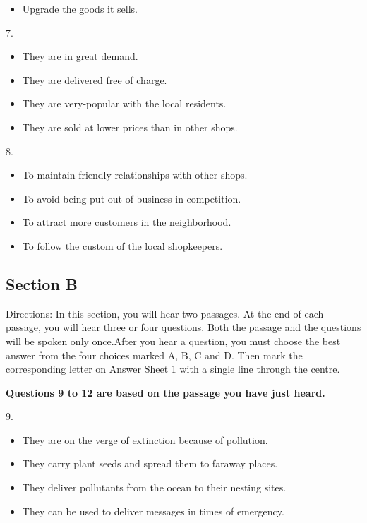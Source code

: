 \documentclass[UTF8,11pt]{ctexart}
\begin{document}
\begin{itemize}[leftmargin=2em,itemsep=.2em,topsep=.4em]\item[D.] Upgrade the goods it sells.
\end{itemize}

7.


\begin{itemize}[leftmargin=2em,itemsep=.2em,topsep=.4em]\item[A.] They are in great demand.
\item[B.] They are delivered free of charge.
\item[C.] They are very-popular with the local residents.
\item[D.] They are sold at lower prices than in other shops.
\end{itemize}

8.


\begin{itemize}[leftmargin=2em,itemsep=.2em,topsep=.4em]\item[A.] To maintain friendly relationships with other shops.
\item[B.] To avoid being put out of business in competition.
\item[C.] To attract more customers in the neighborhood.
\item[D.] To follow the custom of the local shopkeepers.
\end{itemize}

\subsection*{Section B}


Directions: In this section, you will hear two passages. At the end of each passage, you will hear three or four questions. Both the passage and the questions will be spoken only once.After you hear a question, you must choose the best answer from the four choices marked A, B, C and D. Then mark the corresponding letter on Answer Sheet 1 with a single line through the centre.


\textbf{Questions 9 to 12 are based on the passage you have just heard.}


9.


\begin{itemize}[leftmargin=2em,itemsep=.2em,topsep=.4em]\item[A.] They are on the verge of extinction because of pollution.
\item[B.] They carry plant seeds and spread them to faraway places.
\item[C.] They deliver pollutants from the ocean to their nesting sites.
\item[D.] They can be used to deliver messages in times of emergency.
\end{itemize}
\end{document}
